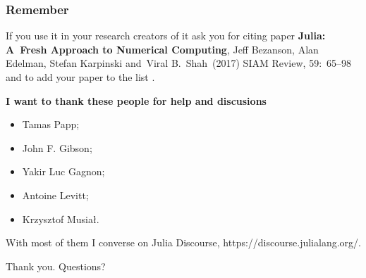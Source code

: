 \documentclass[10pt,t]{beamer}
\begin{document}
\begin{frame}
  \frametitle{Remember}


  \alert{If you use it in your research} creators of it ask you for
  citing paper \textbf{Julia: A~Fresh Approach to Numerical
    Computing}, Jeff Bezanson, Alan Edelman, Stefan Karpinski
  and~Viral B.~Shah~(2017) SIAM Review, 59:~65--98 and to add your
  paper to the list
  .

  \vspace{1em}



  \textbf{I want to thank these people for help and discusions}
  \begin{itemize}

  \item Tamas Papp;

  \item John F. Gibson;

  \item Yakir Luc Gagnon;

  \item Antoine Levitt;

  \item Krzysztof Musiał.

  \end{itemize}

  With most of them I converse on Julia Discourse,
  {https://discourse.julialang.org/}.


\end{frame}










\appendix



\begin{frame}[standout]


  { \color{jBackgroundStyleLight} Thank you. Questions? }

\end{frame}
\end{document}
